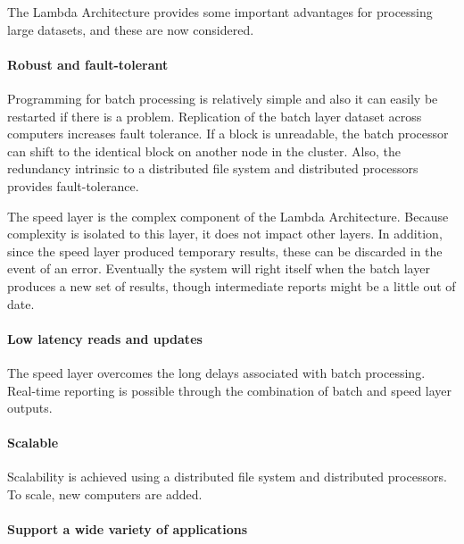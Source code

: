 \documentclass[
]{article}
\begin{document}
The Lambda Architecture provides some important advantages for
processing large datasets, and these are now considered.

\hypertarget{robust-and-fault-tolerant}{%
\paragraph*{Robust and fault-tolerant}\label{robust-and-fault-tolerant}}

Programming for batch processing is relatively simple and also it can
easily be restarted if there is a problem. Replication of the batch
layer dataset across computers increases fault tolerance. If a block is
unreadable, the batch processor can shift to the identical block on
another node in the cluster. Also, the redundancy intrinsic to a
distributed file system and distributed processors provides
fault-tolerance.

The speed layer is the complex component of the Lambda Architecture.
Because complexity is isolated to this layer, it does not impact other
layers. In addition, since the speed layer produced temporary results,
these can be discarded in the event of an error. Eventually the system
will right itself when the batch layer produces a new set of results,
though intermediate reports might be a little out of date.

\hypertarget{low-latency-reads-and-updates}{%
\paragraph*{Low latency reads and updates}\label{low-latency-reads-and-updates}}

The speed layer overcomes the long delays associated with batch
processing. Real-time reporting is possible through the combination of
batch and speed layer outputs.

\hypertarget{scalable}{%
\paragraph*{Scalable}\label{scalable}}

Scalability is achieved using a distributed file system and distributed
processors. To scale, new computers are added.

\hypertarget{support-a-wide-variety-of-applications}{%
\paragraph*{Support a wide variety of applications}\label{support-a-wide-variety-of-applications}}
\end{document}
